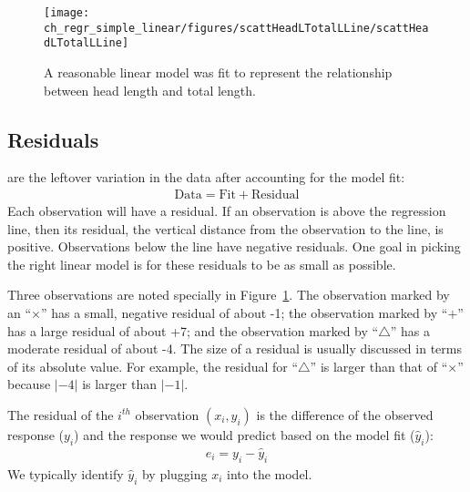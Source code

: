 \begin{figure}
   \centering
   \texttt{[image: ch\_regr\_simple\_linear/figures/scattHeadLTotalLLine/scattHeadLTotalLLine]}
   \caption{A reasonable linear model was fit to represent the relationship between head length and total length.\textC{\vspace{-2mm}}}
   \label{scattHeadLTotalLLine}
\end{figure}

\subsection{Residuals}


 are the leftover variation in the data after accounting for the model fit:
\begin{align*}
\text{Data} = \text{Fit} + \text{Residual}
\end{align*}
Each observation will have a residual. If an observation is above the regression line, then its residual, the vertical distance from the observation to the line, is positive. Observations below the line have negative residuals. One goal in picking the right linear model is for these residuals to be as small as possible.

Three observations are noted specially in Figure~\ref{scattHeadLTotalLLine}. The observation marked by an ``$\times$'' has a small, negative residual of about -1; the observation marked by ``$+$'' has a large residual of about +7; and the observation marked by ``$\triangle$'' has a moderate residual of about -4. The size of a residual is usually discussed in terms of its absolute value. For example, the residual for ``$\triangle$'' is larger than that of ``$\times$'' because $|-4|$ is larger than $|-1|$.

\begin{termBox}{
The residual of the $i^{th}$ observation $(x_i, y_i)$ is the difference of the observed response ($y_i$) and the response we would predict based on the model fit ($\hat{y}_i$):
\begin{eqnarray*}
e_i = y_i - \hat{y}_i
\end{eqnarray*}
We typically identify $\hat{y}_i$ by plugging $x_i$ into the model.}
\end{termBox}

